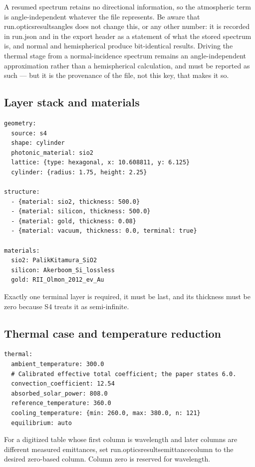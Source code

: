 \documentclass[11pt,a4paper,twoside]{article}
\DeclareRobustCommand{\code}[1]{\begingroup\upshape\ttfamily
  \def\_{\allowbreak\textunderscore\allowbreak}#1\endgroup}
\begin{document}
A resumed spectrum retains no directional information, so the atmospheric term
is angle-independent whatever the file represents. Be aware that
\code{run.optics\_results\_angles} does not change this, or any other number:
it is recorded in \code{run.json} and in the export header as a statement of
what the stored spectrum is, and \code{normal} and \code{hemispherical} produce
bit-identical results. Driving the thermal stage from a normal-incidence
spectrum remains an angle-independent approximation rather than a hemispherical
calculation, and must be reported as such --- but it is the provenance of the
file, not this key, that makes it so.

\subsection{Layer stack and materials}

\begin{lstlisting}
geometry:
  source: s4
  shape: cylinder
  photonic_material: sio2
  lattice: {type: hexagonal, x: 10.608811, y: 6.125}
  cylinder: {radius: 1.75, height: 2.25}

structure:
  - {material: sio2, thickness: 500.0}
  - {material: silicon, thickness: 500.0}
  - {material: gold, thickness: 0.08}
  - {material: vacuum, thickness: 0.0, terminal: true}

materials:
  sio2: PalikKitamura_SiO2
  silicon: Akerboom_Si_lossless
  gold: RII_Olmon_2012_ev_Au
\end{lstlisting}

Exactly one terminal layer is required, it must be last, and its thickness must
be zero because S4 treats it as semi-infinite.

\subsection{Thermal case and temperature reduction}

\begin{lstlisting}
thermal:
  ambient_temperature: 300.0
  # Calibrated effective total coefficient; the paper states 6.0.
  convection_coefficient: 12.54
  absorbed_solar_power: 808.0
  reference_temperature: 360.0
  cooling_temperature: {min: 260.0, max: 380.0, n: 121}
  equilibrium: auto
\end{lstlisting}

For a digitized table whose first column is wavelength and later columns are
different measured emittances, set
\code{run.optics\_results\_emittance\_column} to the desired zero-based column.
Column zero is reserved for wavelength.
\end{document}

